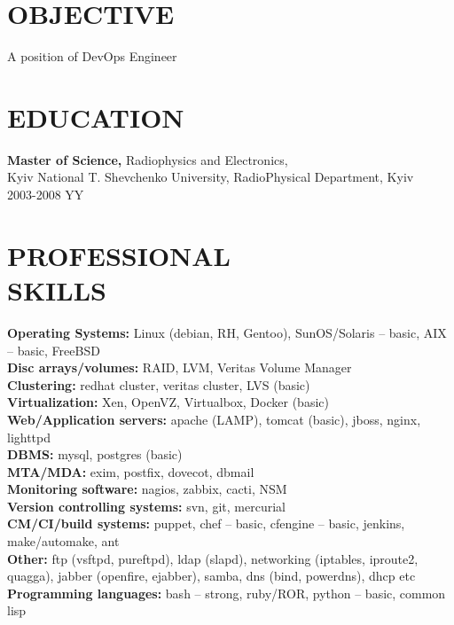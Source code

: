 \documentclass[mymargin,10pt]{res} %
\begin{document}
\begin{resume}

 
\section{OBJECTIVE}  

A position of DevOps Engineer


\section{EDUCATION}

{\bf Master of Science,} Radiophysics and Electronics, \\
Kyiv National T. Shevchenko University, RadioPhysical Department, Kyiv \\
2003-2008 YY
 

\section{PROFESSIONAL \\ SKILLS} 

{\bf Operating Systems:} Linux (debian, RH, Gentoo), SunOS/Solaris – basic, AIX – basic, FreeBSD \\
{\bf Disc arrays/volumes:} RAID, LVM, Veritas Volume Manager \\
{\bf Clustering:} redhat cluster, veritas cluster, LVS (basic) \\
{\bf Virtualization:} Xen, OpenVZ, Virtualbox, Docker (basic) \\
{\bf Web/Application servers:} apache (LAMP), tomcat (basic), jboss, nginx, lighttpd \\
{\bf DBMS:} mysql, postgres (basic) \\
{\bf MTA/MDA:} exim, postfix, dovecot, dbmail \\
{\bf Monitoring software:} nagios, zabbix, cacti, NSM \\
{\bf Version controlling systems:} svn, git, mercurial \\
{\bf CM/CI/build systems:} puppet, chef – basic, cfengine – basic, jenkins, make/automake, ant \\
{\bf Other:} ftp (vsftpd, pureftpd), ldap (slapd), networking (iptables, iproute2, quagga), jabber
(openfire, ejabber), samba, dns (bind, powerdns), dhcp etc \\
{\bf Programming languages:} bash – strong, ruby/ROR, python – basic, common lisp \\
 

\end{resume}
\end{document}
